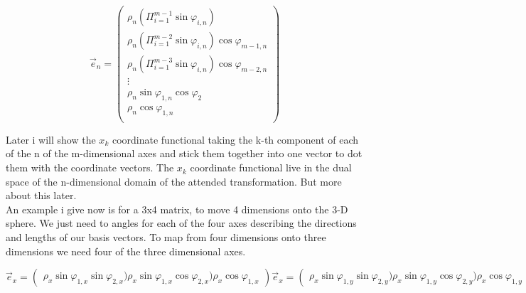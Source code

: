 \documentclass[a4paper]{article}
\begin{document}
\begin{displaymath}
\vec{e}_{n} = \begin{pmatrix}
	\rho_n (\Pi_{i=1}^{m-1}\sin\varphi_{i,n})\\
	\rho_n (\Pi_{i=1}^{m-2}\sin\varphi_{i,n}) \cos \varphi_{m-1,n}\\
	\rho_n (\Pi_{i=1}^{m-3}\sin\varphi_{i,n}) \cos \varphi_{m-2,n}\\
	\vdots\\
	\rho_n \sin \varphi_{1,n} \cos \varphi_{2}\\
	\rho_n \cos \varphi_{1,n}\\
\end{pmatrix}
\end{displaymath}

Later i will show the $x_k$ coordinate functional taking the k-th component of each of the n of the m-dimensional axes and stick them together into one vector to dot them with the coordinate vectors. The $x_k$ coordinate functional live in the dual space of the n-dimensional domain of the attended transformation. But more about this later.\\

An example i give now is for a 3x4 matrix, to move 4 dimensions onto the 3-D sphere. We just need to angles for each of the four axes describing the directions and lengths of our basis vectors. To map from four dimensions onto three dimensions we need four of the three dimensional axes.

\begin{displaymath}
\vec{e}_{x} = \begin{pmatrix}
	\rho_x \sin\varphi_{1,x} \sin \varphi_{2,x})
	\rho_x \sin\varphi_{1,x} \cos \varphi_{2,x})
	\rho_x \cos\varphi_{1,x}
\end{pmatrix}
\vec{e}_{x} = \begin{pmatrix}
	\rho_x \sin\varphi_{1,y} \sin \varphi_{2,y})
	\rho_x \sin\varphi_{1,y} \cos \varphi_{2,y})
	\rho_x \cos\varphi_{1,y}
\end{pmatrix}
\vec{e}_{x} = \begin{pmatrix}
	\rho_x \sin\varphi_{1,z} \sin \varphi_{2,z})
	\rho_x \sin\varphi_{1,z} \cos \varphi_{2,z})
	\rho_x \cos\varphi_{1,z}
\end{pmatrix}
\vec{e}_{x} = \begin{pmatrix}
	\rho_x \sin\varphi_{1,t} \sin \varphi_{2,t})
	\rho_x \sin\varphi_{1,t} \cos \varphi_{2,t})
	\rho_x \cos\varphi_{1,t}
\end{pmatrix}
\end{displaymath}
\end{document}
